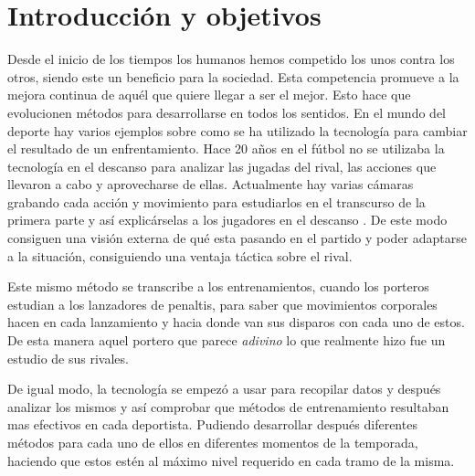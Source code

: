 \chapter{Introducción y objetivos}
\label{cap: Introducción y objetivos}


Desde el inicio de los tiempos los humanos hemos competido los unos contra los otros,
siendo este un beneficio para la sociedad. Esta competencia promueve a la mejora
continua de aquél que quiere llegar a ser el mejor. Esto hace que evolucionen métodos
para desarrollarse en todos los sentidos. En el mundo del deporte hay varios ejemplos sobre
como se ha utilizado la tecnología para cambiar el resultado de un enfrentamiento.
Hace 20 años en el fútbol no se utilizaba la tecnología en el descanso para analizar
las jugadas del rival, las acciones que llevaron a cabo y aprovecharse de ellas.
Actualmente hay varias cámaras grabando cada acción y movimiento para estudiarlos
en el transcurso de la primera parte y así explicárselas a los jugadores en el descanso
\cite{futbolDescanso}.
De este modo consiguen una visión externa de qué esta pasando en el partido y
poder adaptarse a la situación, consiguiendo una ventaja táctica sobre el rival.

Este mismo método se transcribe a los entrenamientos, cuando los porteros estudian
a los lanzadores de penaltis, para saber que movimientos corporales hacen en cada
lanzamiento y hacia donde van sus disparos con cada uno de estos. De esta manera
aquel portero que parece \textit{adivino} lo que realmente hizo fue un estudio
de sus rivales.

De igual modo, la tecnología se empezó a usar para recopilar datos y después analizar
los mismos y así comprobar que métodos de entrenamiento resultaban mas efectivos
en cada deportista. Pudiendo desarrollar después diferentes métodos para cada
uno de ellos en diferentes momentos de la temporada, haciendo que estos estén
al máximo nivel requerido en cada tramo de la misma.

